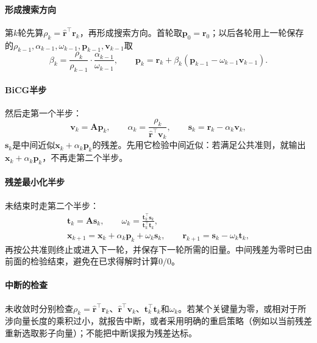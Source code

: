 \paragraph{形成搜索方向}
第$k$轮先算$\rho_k=\widehat{\bm r}^\top\bm r_k$，再形成搜索方向。首轮取$\bm p_0=\bm r_0$；以后各轮用上一轮保存的$\rho_{k-1},\alpha_{k-1},\omega_{k-1},\bm p_{k-1},\bm v_{k-1}$取
\[
 \beta_k=\frac{\rho_k}{\rho_{k-1}}\cdot\frac{\alpha_{k-1}}{\omega_{k-1}},\qquad
 \bm p_k=\bm r_k+\beta_k(\bm p_{k-1}-\omega_{k-1}\bm v_{k-1}).
\]

\paragraph{BiCG半步}
然后走第一个半步：
\[
 \bm v_k=\bm A\bm p_k,\qquad
 \alpha_k=\frac{\rho_k}{\widehat{\bm r}^\top\bm v_k},\qquad
 \bm s_k=\bm r_k-\alpha_k\bm v_k ,
\]
$\bm s_k$是中间近似$\bm x_k+\alpha_k\bm p_k$的残差。先用它检验中间近似：若满足公共准则，就输出$\bm x_k+\alpha_k\bm p_k$，不再走第二个半步。

\paragraph{残差最小化半步}
未结束时走第二个半步：
\[
 \begin{gathered}
 \bm t_k=\bm A\bm s_k,\qquad \omega_k=\frac{\bm t_k^\top\bm s_k}{\bm t_k^\top\bm t_k},\\
 \bm x_{k+1}=\bm x_k+\alpha_k\bm p_k+\omega_k\bm s_k,\qquad
 \bm r_{k+1}=\bm s_k-\omega_k\bm t_k ,
 \end{gathered}
\]
再按公共准则终止或进入下一轮，并保存下一轮所需的旧量。中间残差为零时已由前面的检验结束，避免在已求得解时计算$0/0$。

\paragraph{中断的检查}
未收敛时分别检查$\rho_k=\widehat{\bm r}^\top\bm r_k$、$\widehat{\bm r}^\top\bm v_k$、$\bm t_k^\top\bm t_k$和$\omega_k$。若某个关键量为零，或相对于所涉向量长度的乘积过小，就报告中断，或者采用明确的重启策略（例如以当前残差重新选取影子向量）；不能把中断误报为残差达标。

